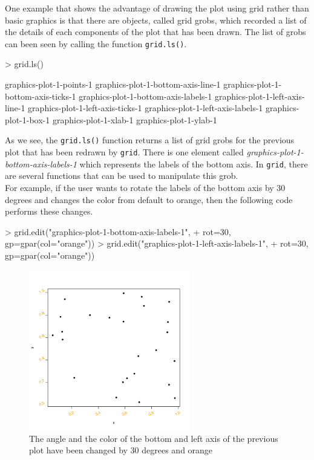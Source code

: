 \documentclass[paper=a4, fontsize=11pt]{report}
\begin{document}
One example that shows the advantage of drawing the plot using grid rather than basic graphics is that there are objects, called grid grobs, which recorded a list of the details of each components of the plot that has been drawn. The list of grobs can been seen by calling the function \texttt{grid.ls()}. \\
\begin{Schunk}
\begin{Sinput}
> grid.ls()
\end{Sinput}
\begin{Soutput}
graphics-plot-1-points-1
graphics-plot-1-bottom-axis-line-1
graphics-plot-1-bottom-axis-ticks-1
graphics-plot-1-bottom-axis-labels-1
graphics-plot-1-left-axis-line-1
graphics-plot-1-left-axis-ticks-1
graphics-plot-1-left-axis-labels-1
graphics-plot-1-box-1
graphics-plot-1-xlab-1
graphics-plot-1-ylab-1
\end{Soutput}
\end{Schunk}


As we see, the \texttt{grid.ls()} function returns a list of grid grobs for the previous plot that has been redrawn by \texttt{grid}. There is one element called \textit{graphics-plot-1-bottom-axis-labels-1} which represents the labels of the bottom axis. In \texttt{grid}, there are several functions that can be used to manipulate this grob. \\

For example, if the user wants to rotate the labels of the bottom axis by 30 degrees and changes the color from default to orange, then the following code performs these changes.
\begin{Schunk}
\begin{Sinput}
> grid.edit("graphics-plot-1-bottom-axis-labels-1", 
+           rot=30, gp=gpar(col="orange"))
> grid.edit("graphics-plot-1-left-axis-labels-1", 
+           rot=30, gp=gpar(col="orange"))
\end{Sinput}
\end{Schunk}
\newpage
\begin{figure}[h]
\begin{center}
  \includegraphics[height = 7cm, width = 7cm]{figure/report_basic_demo_4.pdf}
  \caption{The angle and the color of the bottom and left axis of the previous plot have been changed by 30 degrees and orange}
  	\label{figure3}
\end{center}
\end{figure}
\end{document}
